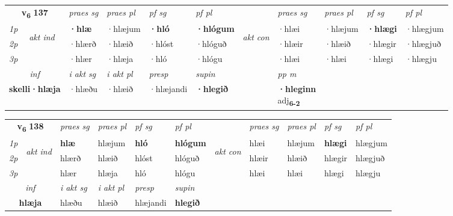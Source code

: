 \noindent
\begin{tabular}{lllllllllll} \toprule
\multicolumn{2}{c}{\textbf{v{\textsubscript{6}}} \Large{\textbf{137}}}  &  \textit{praes sg}  & \textit{praes pl}  &\textit{ pf sg} & \textit{pf pl} &  &  \textit{praes sg}  & \textit{praes pl}  & \textit{pf sg} & \textit{pf pl } \\*
	\cmidrule{3-6} \cmidrule{8-11}
 {\textit{1p}} & \multirow{3}{*}{\begin{turn}{90}\textit{akt ind}\end{turn}} & \textbf{·hlæ} & ·hlæjum & \textbf{·hló} & \textbf{·hlógum} & \multirow{3}{*}{\begin{turn}{90}\textit{akt con}\end{turn}} &·hlæi & ·hlæjum & \textbf{·hlægi} & ·hlægjum\\*
 {\textit{2p}} &  &  ·hlærð  & ·hlæið & ·hlóst & ·hlóguð & & ·hlæir & ·hlæið & ·hlægir & ·hlægjuð \\*
{\textit{3p}} &  & ·hlær & ·hlæja & ·hló & ·hlógu & & ·hlæi & ·hlæi& ·hlægi & ·hlægju \\*
\cmidrule{3-6} \cmidrule{8-11}

   \multicolumn{2}{c}{\textit{inf}}  & \textit{i akt sg} & \textit{i akt pl}   & \textit{presp} & \textit{supin}  && \textit{pp m} \\*
  \multicolumn{2}{c}{\textbf{skelli\allowbreak ·hlæja}} & ·hlæðu  & ·hlæið   & ·hlæjandi &  \textbf{·hlegið}  && \specialcell{\textbf{·hleginn} \\ adj\textbf{\textsubscript{6-2}}} \\*
\end{tabular}

\noindent
\begin{tabular}{lllllllllll} \toprule
\multicolumn{2}{c}{\textbf{v{\textsubscript{6}}} \Large{\textbf{138}}}  &  \textit{praes sg}  & \textit{praes pl}  &\textit{ pf sg} & \textit{pf pl} &  &  \textit{praes sg}  & \textit{praes pl}  & \textit{pf sg} & \textit{pf pl } \\*
	\cmidrule{3-6} \cmidrule{8-11}
 {\textit{1p}} & \multirow{3}{*}{\begin{turn}{90}\textit{akt ind}\end{turn}} & \textbf{hlæ} & hlæjum & \textbf{hló} & \textbf{hlógum} & \multirow{3}{*}{\begin{turn}{90}\textit{akt con}\end{turn}} &hlæi & hlæjum & \textbf{hlægi} & hlægjum\\*
 {\textit{2p}} &  &  hlærð  & hlæið & hlóst & hlóguð & & hlæir & hlæið & hlægir & hlægjuð \\*
{\textit{3p}} &  & hlær & hlæja & hló & hlógu & & hlæi & hlæi& hlægi & hlægju \\*
\cmidrule{3-6} \cmidrule{8-11}

   \multicolumn{2}{c}{\textit{inf}}  & \textit{i akt sg} & \textit{i akt pl}   & \textit{presp} & \textit{supin}   \\*
  \multicolumn{2}{c}{\textbf{hlæja}} & hlæðu  & hlæið   & hlæjandi &  \textbf{hlegið}   \\*
\end{tabular}


